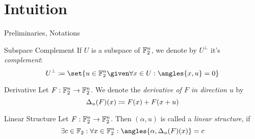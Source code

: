 \section{Intuition}
\begin{frame}{Preliminaries, Notations}
    \begin{block}{Subspace Complement}
        If $U$ is a subspace of $\mathbb{F}_2^n$, we denote by $U^\perp$ it's \emph{complement}:
        \vspace{-0.5em}
        \begin{equation*}
            U^\perp \coloneqq \set{u \in \F_2^n \given \forall x \in U: \angles{x, u} = 0}
            \vspace*{-0.5em}
        \end{equation*}
    \end{block}
    \begin{block}{Derivative}
        Let $F : \mathbb{F}_2^n \to \mathbb{F}_2^n$.
        We denote the \emph{derivative of $F$ in direction $u$} by
        \vspace*{-0.5em}
        \begin{equation*}
            \Delta_u(F)(x) \coloneqq F(x) + F(x + u)
            \vspace*{-0.5em}
        \end{equation*}
    \end{block}
    \begin{block}{Linear Structure}
        Let $F : \mathbb{F}_2^n \to \mathbb{F}_2^n$.
        Then $(\alpha, u)$ is called a \emph{linear structure}, if
        \vspace*{-0.5em}
        \begin{equation*}
            \exists c \in \F_2 : \forall x \in \F_2^n : \angles{\alpha, \Delta_u(F)(x)} = c
            \vspace*{-0.5em}
        \end{equation*}
    \end{block}
\end{frame}

